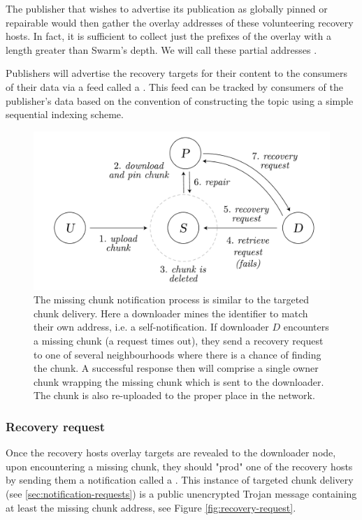 The publisher that wishes to advertise its publication as globally pinned or repairable would then gather the overlay addresses of these volunteering recovery hosts. In fact, it is sufficient to collect just the prefixes of the overlay with a length greater than Swarm's depth. We will call these partial addresses .

Publishers will advertise the recovery targets for their content to the consumers of their data via a feed called a . This feed can be tracked by consumers of the publisher's data based on the convention of constructing the topic using a simple sequential indexing scheme. 

\begin{figure}[htbp]
\centering
\includegraphics[width=.8\textwidth]{fig/missing-chunk-notification.pdf} \caption[Missing chunk notification process \statusgreen]{The missing chunk notification process is similar to the targeted chunk delivery. Here a downloader mines the identifier to match their own address, i.e. a self-notification. If downloader $D$ encounters a missing chunk (a request times out), they send a recovery request to one of several neighbourhoods where there is a chance of finding the chunk. A successful response then will comprise a single owner chunk wrapping the missing chunk which is sent to the downloader. The chunk is also re-uploaded to the proper place in the network.}
\label{fig:missing-chunk-notification}
\end{figure}

\subsubsection{Recovery request}

Once the recovery hosts overlay targets are revealed to the downloader node, upon encountering a missing chunk, they should "prod" one of the recovery hosts by sending them a notification called a . This instance of targeted chunk delivery (see \ref{sec:notification-requests}) is a public unencrypted Trojan message containing at least the missing chunk address, see Figure \ref{fig:recovery-request}.


